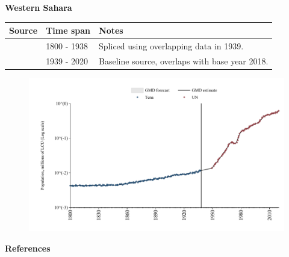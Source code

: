 \documentclass[12pt,a4paper,landscape]{article}
\begin{document}
\begin{adjustbox}{max totalsize={\paperwidth}{\paperheight},center}
\begin{minipage}[t][\textheight][t]{\textwidth}
\vspace*{0.5cm}
{}
\begin{center}
{\Large\bfseries Western Sahara}
\end{center}
\vspace{0.5cm}
\begin{table}[H]
\centering
\small
\begin{tabular}{|l|l|l|}
\hline
\textbf{Source} & \textbf{Time span} & \textbf{Notes} \\
\hline
\rowcolor{white}\cite{Tena}& 1800 - 1938 &Spliced using overlapping data in 1939.\\
\rowcolor{lightgray}\cite{UN}& 1939 - 2020 &Baseline source, overlaps with base year 2018.\\
\hline
\end{tabular}
\end{table}
\begin{figure}[H]
\centering
\includegraphics[width=\textwidth,height=0.6\textheight,keepaspectratio]{graphs/ESH_pop.pdf}
\end{figure}
\end{minipage}
\end{adjustbox}
{}
\begin{center}
{\Large\bfseries References}
\end{center}
\small


\end{document}
